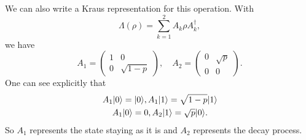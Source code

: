 We can also write a Kraus representation for this operation. With
\begin{equation}
    \Lambda(\rho)=\sum_{k=1}^2 A_k \rho A_k^\dagger,
\end{equation}
we have
\begin{equation}
    A_1=\begin{pmatrix} 1& 0 \\
    0& \sqrt{1-p}
    \end{pmatrix},
    \quad
    A_2 = \begin{pmatrix}
    0 &\sqrt{p}\\
    0 &0
    \end{pmatrix}.
\end{equation}
One can see explicitly that
\begin{gather}
    A_1\lvert0\rangle= \lvert0\rangle, A_1\lvert1\rangle =\sqrt{1-p}\lvert1\rangle\\
    A_1 \lvert0\rangle = 0, A_2 \lvert1\rangle=\sqrt{p}\lvert0\rangle.
\end{gather}
So $A_1$ represents the state staying as it is and $A_2$ represents the decay process.

